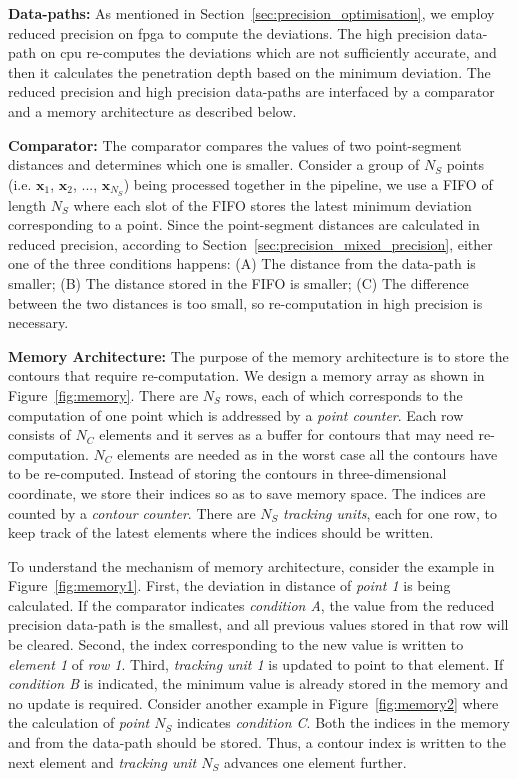 \noindent \textbf{Data-paths:}
As mentioned in Section~\ref{sec:precision_optimisation}, we employ reduced precision on \gls{fpga} to compute the deviations.
The high precision data-path on \gls{cpu} re-computes the deviations which are not sufficiently accurate,
and then it calculates the penetration depth based on the minimum deviation.
The reduced precision and high precision data-paths are interfaced by a comparator and a memory architecture as described below.

\noindent \textbf{Comparator:}
The comparator compares the values of two point-segment distances and determines which one is smaller.
Consider a group of $N_{S}$ points (i.e. $\textbf{x}_1$, $\textbf{x}_2$, ..., $\textbf{x}_{N_S}$) being processed together in the pipeline, we use a FIFO of length $N_{S}$ where
each slot of the FIFO stores the latest minimum deviation corresponding to a point.
Since the point-segment distances are calculated in reduced precision, according to Section~\ref{sec:precision_mixed_precision}, 
either one of the three conditions happens:
(A) The distance from the data-path is smaller; 
(B) The distance stored in the FIFO is smaller; 
(C) The difference between the two distances is too small, so re-computation in high precision is necessary.

\noindent \textbf{Memory Architecture:}
The purpose of the memory architecture is to store the contours that require re-computation.
We design a memory array as shown in Figure~\ref{fig:memory}.
There are $N_S$ rows, each of which corresponds to the computation of one point which is addressed by a \textit{point counter}.
Each row consists of $N_C$ elements and it serves as a buffer for contours that may need re-computation.
$N_C$ elements are needed as in the worst case all the contours have to be re-computed.
Instead of storing the contours in three-dimensional coordinate, we store their indices so as to save memory space.
The indices are counted by a \textit{contour counter}.
There are $N_S$ \textit{tracking units}, each for one row, to keep track of the latest elements where the indices should be written.

To understand the mechanism of memory architecture, consider the example in Figure~\ref{fig:memory1}.
First, the deviation in distance of \textit{point 1} is being calculated.
If the comparator indicates \emph{condition A}, the value from the reduced precision data-path is the smallest, and all previous values stored in that row will be cleared.
Second, the index corresponding to the new value is written to \textit{element 1} of \textit{row 1}.
Third, \textit{tracking unit 1} is updated to point to that element.
If \emph{condition B} is indicated, the minimum value is already stored in the memory and no update is required.
Consider another example in Figure~\ref{fig:memory2} where the calculation of \textit{point $N_S$} indicates \emph{condition C}. 
Both the indices in the memory and from the data-path should be stored.
Thus, a contour index is written to the next element and \textit{tracking unit $N_S$} advances one element further.

